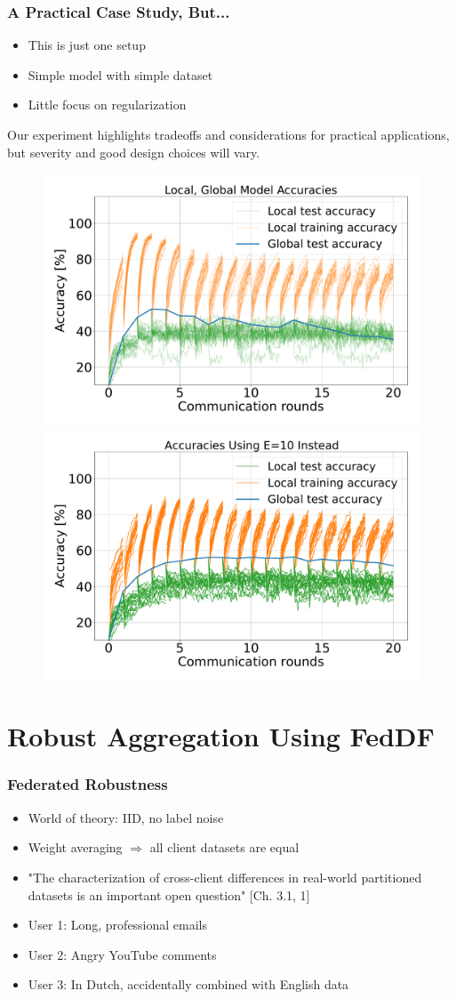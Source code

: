 \documentclass{beamer}
\begin{document}
\begin{frame}
\frametitle{A Practical Case Study, But...}
    \small
    \begin{itemize}
        \item This is just one setup
        \item Simple model with simple dataset
        \item Little focus on regularization
    \end{itemize}
    Our experiment highlights tradeoffs and considerations for practical applications, but severity and good design choices will vary.
    \begin{figure}[H]
        \centering
        \includegraphics[width=.49\linewidth]{imgs/accuracy.pdf}
        \includegraphics[width=.49\linewidth]{imgs/accuracyE10.pdf}
    \end{figure}\noindent
\end{frame}

\section{Robust Aggregation Using FedDF}
\begin{frame}
    \frametitle{Federated Robustness}
    \begin{itemize}
        \item World of theory: IID, no label noise
        \item Weight averaging $\Rightarrow$ all client datasets are equal
        \item "The characterization of cross-client differences in real-world partitioned datasets is an important open question" [Ch. 3.1, 1]
    \end{itemize}

    \begin{example}
        \begin{itemize}
            \item User 1: Long, professional emails
            \item User 2: Angry YouTube comments
            \item User 3: In Dutch, accidentally combined with English data
        \end{itemize}
    \end{example}
\end{frame}
\end{document}
